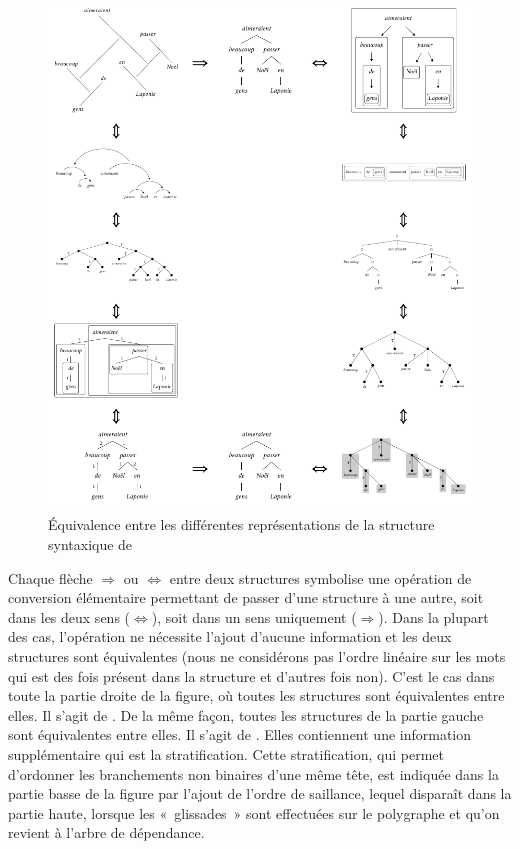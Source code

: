 \begin{figure}
\caption{\label{fig:rosace}Équivalence entre les différentes représentations de la structure syntaxique de }
\includegraphics[width=\textwidth]{figures/graphs-collection.pdf}
\end{figure}

Chaque flèche $\Rightarrow$ ou $\Leftrightarrow$ entre deux structures symbolise une opération de conversion élémentaire permettant de passer d’une structure à une autre, soit dans les deux sens ($\Leftrightarrow$), soit dans un sens uniquement ($\Rightarrow$). Dans la plupart des cas, l’opération ne nécessite l’ajout d’aucune information et les deux structures sont équivalentes (nous ne considérons pas l’ordre linéaire sur les mots qui est des fois présent dans la structure et d’autres fois non). C’est le cas dans toute la partie droite de la figure, où toutes les structures sont équivalentes entre elles. Il s'agit de . De la même façon, toutes les structures de la partie gauche sont équivalentes entre elles. Il s'agit de . Elles contiennent une information supplémentaire qui est la stratification. Cette stratification, qui permet d'ordonner les branchements non binaires d'une même tête, est indiquée dans la partie basse de la figure par l’ajout de l’ordre de saillance, lequel disparaît dans la partie haute, lorsque les «~glissades~» sont effectuées sur le polygraphe et qu’on revient à l’arbre de dépendance.\largerpage[2]

